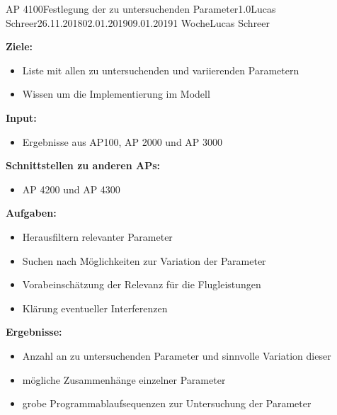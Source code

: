 \clearpage
\begin{wpd}{AP 4100}{Festlegung der zu untersuchenden Parameter}{1.0}{Lucas Schreer}{26.11.2018}{02.01.2019}{09.01.2019}{1 Woche}{Lucas Schreer}
    {
    \textbf{Ziele:}
    \begin{itemize}
        \item Liste mit allen zu untersuchenden und variierenden Parametern
        \item Wissen um die Implementierung im Modell
    \end{itemize}
    \textbf{Input:}
    \begin{itemize}
        \item Ergebnisse aus AP100, AP 2000 und AP 3000
    \end{itemize}
    \textbf{Schnittstellen zu anderen APs:}
    \begin{itemize}
        \item AP 4200 und AP 4300
    \end{itemize}
    \textbf{Aufgaben:}
    \begin{itemize}
        \item Herausfiltern relevanter Parameter
        \item Suchen nach Möglichkeiten zur Variation der Parameter
        \item Vorabeinschätzung der Relevanz für die Flugleistungen
        \item Klärung eventueller Interferenzen
    \end{itemize}
    \textbf{Ergebnisse:}
    \begin{itemize}
        \item Anzahl an zu untersuchenden Parameter und sinnvolle Variation dieser
        \item mögliche Zusammenhänge einzelner Parameter
        \item grobe Programmablaufsequenzen zur Untersuchung der Parameter 
    \end{itemize}
    }
\end{wpd}


